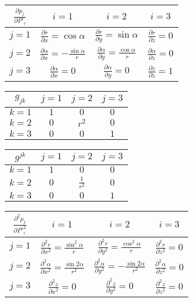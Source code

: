 \begin{tabular}{| c || c | c | c |}
\hline
\(\frac{\partial p_j}{\partial P'_i}\) & \(i=1\) & \(i=2\) & \(i=3\)\\
\hline
\hline
\(j=1\) & \(\frac{\partial r}{\partial x} = \cos \alpha\) & \(\frac{\partial r}{\partial y} = \sin \alpha\) & \(\frac{\partial r}{\partial z} = 0\)\\
\hline
\(j=2\) & \(\frac{\partial \alpha}{\partial x} = -\frac{\sin \alpha}{r}\) & \(\frac{\partial \alpha}{\partial y} = \frac{\cos \alpha}{r}\) & \(\frac{\partial \alpha}{\partial z} = 0\)\\
\hline
\(j=3\) & \(\frac{\partial \alpha}{\partial x} = 0\) & \(\frac{\partial \alpha}{\partial y} = 0\) & \(\frac{\partial z}{\partial z} = 1\)\\
\hline
\end{tabular}

\begin{tabular}{| c || c | c | c |}
\hline
\(g_{jk}\) & \(j=1\) & \(j=2\) & \(j=3\) \\
\hline
\hline
\(k=1\) & \(1\) & \(0\) & \(0\) \\
\hline
\(k=2\) & \(0\) & \(r^2\) & \(0\) \\
\hline
\(k=3\) & \(0\) & \(0\) & \(1\) \\
\hline
\end{tabular}

\begin{tabular}{| c || c | c | c |}
\hline
\(g^{jk}\) & \(j=1\) & \(j=2\) & \(j=3\) \\
\hline
\hline
\(k=1\) & \(1\) & \(0\) & \(0\) \\
\hline
\(k=2\) & \(0\) & \(\frac{1}{r^2}\) & \(0\) \\
\hline
\(k=3\) & \(0\) & \(0\) & \(1\) \\
\hline
\end{tabular}

\begin{tabular}{| c || c | c | c |}
\hline
\(\frac{\partial^2 p_j}{\partial P'^2_i}\) & \(i=1\) & \(i=2\) & \(i=3\) \\
\hline
\hline
\(j=1\) & \(\frac{\partial^2 r}{\partial x^2} = \frac{\sin^2 \alpha}{r}\) & \(\frac{\partial^2 r}{\partial y^2} = \frac{\cos^2 \alpha}{r}\) & \(\frac{\partial^2 r}{\partial z^2} = 0\) \\
\hline
\(j=2\) & \(\frac{\partial^2 \alpha}{\partial x^2} = \frac{\sin 2 \alpha}{r^2}\) & \(\frac{\partial^2 \alpha}{\partial y^2} = -\frac{\sin 2\alpha}{r^2}\) & \(\frac{\partial^2 \alpha}{\partial z^2} = 0\) \\
\hline
\(j=3\) & \(\frac{\partial^2 z}{\partial x^2} = 0\) & \(\frac{\partial^2 z}{\partial y^2} = 0\) & \(\frac{\partial^2 z}{\partial z^2} = 0\) \\
\hline
\end{tabular}


